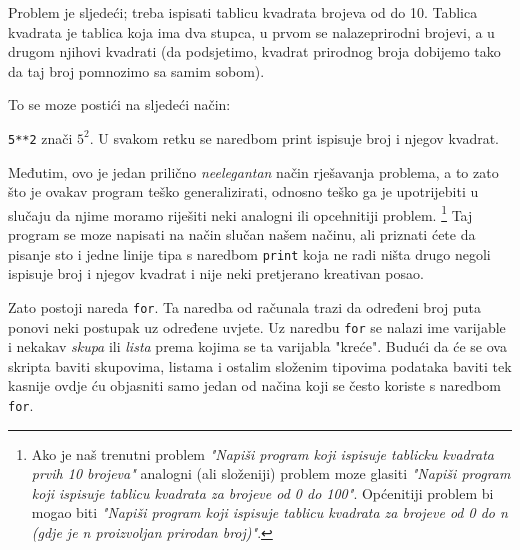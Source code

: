 Problem je sljedeći; treba ispisati tablicu kvadrata brojeva od do 10.
Tablica kvadrata je tablica koja ima dva stupca, u prvom se nalazeprirodni
brojevi, a u drugom njihovi kvadrati (da podsjetimo, kvadrat prirodnog
broja dobijemo tako da taj broj pomnozimo sa samim sobom).

To se moze postići na sljedeći način:


\verb"5**2" znači $5^2$. U svakom retku se naredbom print ispisuje broj i
njegov kvadrat. 

Međutim, ovo je jedan prilično \emph{neelegantan} način rješavanja
problema, a to zato što je ovakav program teško generalizirati,
odnosno teško ga je upotrijebiti u slučaju da njime moramo
riješiti neki analogni ili opcehnitiji problem. 
\footnote{
	Ako je naš trenutni
	problem \emph{"Napiši program koji ispisuje tablicku kvadrata
	prvih 10 brojeva"} analogni (ali složeniji) problem moze glasiti
	\emph{"Napiši program koji ispisuje tablicu kvadrata za brojeve
	od 0 do 100"}. Općenitiji problem bi mogao biti \emph{"Napiši
	program koji ispisuje tablicu kvadrata za brojeve od 0 do n (gdje
	je n proizvoljan prirodan broj)"}. 
}
Taj program se moze napisati
na način slučan našem načinu, ali priznati ćete da pisanje
sto i jedne linije tipa s naredbom \verb"print" koja ne radi ništa
drugo negoli ispisuje broj i njegov kvadrat i nije neki pretjerano
kreativan posao.

Zato postoji nareda \verb"for". Ta naredba od računala trazi da
određeni broj puta ponovi neki postupak uz određene uvjete. Uz
naredbu \verb"for" se nalazi ime varijable i nekakav \emph{skupa}
ili \emph{lista} prema kojima se ta varijabla "kreće". Budući da
će se ova skripta baviti skupovima, listama i ostalim složenim
tipovima podataka baviti tek kasnije ovdje ću objasniti samo jedan
od načina koji se često koriste s naredbom \verb"for".

